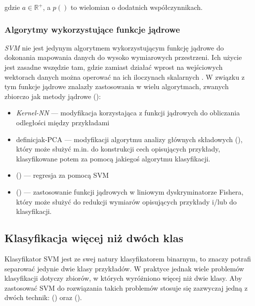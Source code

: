 gdzie $ a \in \mathbb{R}^{+} $, a $ p() $ to wielomian o dodatnich współczynnikach.


\subsubsection{Algorytmy wykorzystujące funkcje jądrowe}
\emph{SVM} nie jest jedynym algorytmem wykorzystującym funkcję jądrowe do dokonania mapowania danych do wysoko wymiarowych przestrzeni. Ich użycie jest zasadne wszędzie tam, gdzie zamiast działać wprost na wejściowych wektorach danych można operować na ich iloczynach skalarnych \cite{scholkopf_learning_2002}. W związku z tym funkcje jądrowe znalazły zastosowania w wielu algorytmach, zwanych zbiorczo jak metody jądrowe ():
\begin{itemize}
	\item \emph{Kernel-NN} \cite{Yu:2002:KNA:607789.607852} --- modyfikacja  korzystająca z funkcji jądrowych do obliczania odległości między przykładami
	\item definicja{k-PCA} \cite{scholkopf_learning_2002} --- modyfikacji algorytmu analizy głównych składowych (), który może służyć m.in. do konstrukcji cech opisujących przykłady, klasyfikowane potem za pomocą jakiegoś algorytmu klasyfikacji.
	\item {} () --- regresja za pomocą SVM
	\item {} () \cite{scholkopf_learning_2002} --- zastosowanie funkcji jądrowych w liniowym dyskryminatorze Fishera, który może służyć do redukcji wymiarów opisujących przykłady i/lub do klasyfikacji.
\end{itemize}

\subsection{Klasyfikacja więcej niż dwóch klas}
Klasyfikator SVM jest ze swej natury klasyfikatorem binarnym, to znaczy potrafi separować jedynie dwie klasy przykładów. W praktyce jednak wiele problemów klasyfikacji dotyczy zbiorów, w których wyróżniono więcej niż dwie klasy. Aby zastosować SVM do rozwiązania takich problemów stosuje się zazwyczaj jedną z dwóch technik:  () oraz  (). 

